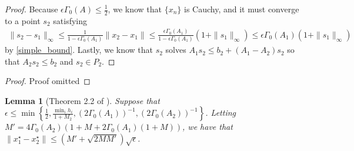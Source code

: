 \documentclass{article}
\newtheorem{lemma}[theorem]{Lemma}
\theoremstyle{case}
\def\includeproofs{1}
\begin{document}
\begin{proof}
Because $\epsilon \Gamma_0(A)\le\frac 1 2$, we know that $\{x_n\}$ is Cauchy, and it must converge to a point $s_2$ satisfying
\begin{align*}
\|s_2 - s_1\|_\infty \le \frac{1}{1 - \epsilon\Gamma_0(A_1)}\|x_2 - x_1\| \le \frac{\epsilon\Gamma_0(A_1)}{1 - \epsilon\Gamma_0(A_1)}\left(1 + \|s_1\|_{\infty}\right) \le \epsilon\Gamma_0(A_1)\left(1 + \|s_1\|_{\infty}\right)
\end{align*}
by \cref{simple_bound}.
Lastly, we know that $s_2$ solves $A_1s_2 \le b_2 + (A_1 - A_2)s_2$ so that $A_2s_2 \le b_2$ and $s_2 \in P_2$.
\end{proof}

\else
\begin{proof}
Proof omitted
\end{proof}
\fi

% 

\begin{lemma}[Theorem 2.2 of \cite{dummy:continuity}]
\label{2_2}
Suppose that $\epsilon\le \min\left\{\frac 1 2, \frac{\min_i h_i}{1 + M_2},\left(2\Gamma_0(A_1)\right)^{-1}, \left(2\Gamma_0(A_2)\right)^{-1}\right\}$.
Letting $M' = 4\Gamma_0(A_2)\left(1 + M + 2\Gamma_0(A_1)\left(1 + M\right)\right)$, we have that $\|x_1^{\star} - x_2^{\star}\| \le \left( M' + \sqrt{2MM'}\right)\sqrt{\epsilon}$.
\end{lemma}
\end{document}
